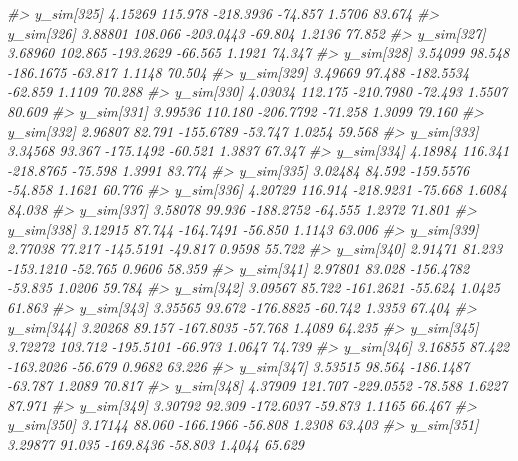 \documentclass[
  10pt,
  italian,
  a4paper,
  extrafontsizes,onecolumn,openright
  ]{memoir}
\newenvironment{Shaded}{\begin{snugshade}}{\end{snugshade}}
\newcommand{\CommentTok}[1]{\textcolor[rgb]{0.56,0.35,0.01}{\textit{#1}}}
\begin{document}
\begin{Shaded}
\begin{Highlighting}[]
\CommentTok{\#\textgreater{}   y\_sim[325]  4.15269 115.978 {-}218.3936 {-}74.857  1.5706  83.674}
\CommentTok{\#\textgreater{}   y\_sim[326]  3.88801 108.066 {-}203.0443 {-}69.804  1.2136  77.852}
\CommentTok{\#\textgreater{}   y\_sim[327]  3.68960 102.865 {-}193.2629 {-}66.565  1.1921  74.347}
\CommentTok{\#\textgreater{}   y\_sim[328]  3.54099  98.548 {-}186.1675 {-}63.817  1.1148  70.504}
\CommentTok{\#\textgreater{}   y\_sim[329]  3.49669  97.488 {-}182.5534 {-}62.859  1.1109  70.288}
\CommentTok{\#\textgreater{}   y\_sim[330]  4.03034 112.175 {-}210.7980 {-}72.493  1.5507  80.609}
\CommentTok{\#\textgreater{}   y\_sim[331]  3.99536 110.180 {-}206.7792 {-}71.258  1.3099  79.160}
\CommentTok{\#\textgreater{}   y\_sim[332]  2.96807  82.791 {-}155.6789 {-}53.747  1.0254  59.568}
\CommentTok{\#\textgreater{}   y\_sim[333]  3.34568  93.367 {-}175.1492 {-}60.521  1.3837  67.347}
\CommentTok{\#\textgreater{}   y\_sim[334]  4.18984 116.341 {-}218.8765 {-}75.598  1.3991  83.774}
\CommentTok{\#\textgreater{}   y\_sim[335]  3.02484  84.592 {-}159.5576 {-}54.858  1.1621  60.776}
\CommentTok{\#\textgreater{}   y\_sim[336]  4.20729 116.914 {-}218.9231 {-}75.668  1.6084  84.038}
\CommentTok{\#\textgreater{}   y\_sim[337]  3.58078  99.936 {-}188.2752 {-}64.555  1.2372  71.801}
\CommentTok{\#\textgreater{}   y\_sim[338]  3.12915  87.744 {-}164.7491 {-}56.850  1.1143  63.006}
\CommentTok{\#\textgreater{}   y\_sim[339]  2.77038  77.217 {-}145.5191 {-}49.817  0.9598  55.722}
\CommentTok{\#\textgreater{}   y\_sim[340]  2.91471  81.233 {-}153.1210 {-}52.765  0.9606  58.359}
\CommentTok{\#\textgreater{}   y\_sim[341]  2.97801  83.028 {-}156.4782 {-}53.835  1.0206  59.784}
\CommentTok{\#\textgreater{}   y\_sim[342]  3.09567  85.722 {-}161.2621 {-}55.624  1.0425  61.863}
\CommentTok{\#\textgreater{}   y\_sim[343]  3.35565  93.672 {-}176.8825 {-}60.742  1.3353  67.404}
\CommentTok{\#\textgreater{}   y\_sim[344]  3.20268  89.157 {-}167.8035 {-}57.768  1.4089  64.235}
\CommentTok{\#\textgreater{}   y\_sim[345]  3.72272 103.712 {-}195.5101 {-}66.973  1.0647  74.739}
\CommentTok{\#\textgreater{}   y\_sim[346]  3.16855  87.422 {-}163.2026 {-}56.679  0.9682  63.226}
\CommentTok{\#\textgreater{}   y\_sim[347]  3.53515  98.564 {-}186.1487 {-}63.787  1.2089  70.817}
\CommentTok{\#\textgreater{}   y\_sim[348]  4.37909 121.707 {-}229.0552 {-}78.588  1.6227  87.971}
\CommentTok{\#\textgreater{}   y\_sim[349]  3.30792  92.309 {-}172.6037 {-}59.873  1.1165  66.467}
\CommentTok{\#\textgreater{}   y\_sim[350]  3.17144  88.060 {-}166.1966 {-}56.808  1.2308  63.403}
\CommentTok{\#\textgreater{}   y\_sim[351]  3.29877  91.035 {-}169.8436 {-}58.803  1.4044  65.629}

\end{Highlighting}
\end{Shaded}
\end{document}
